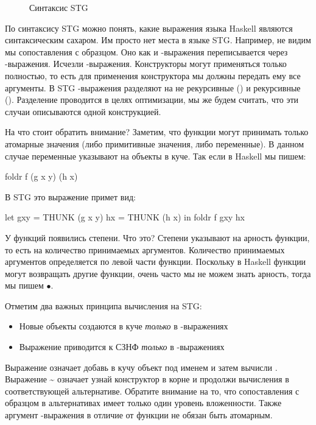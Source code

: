 \begin{figure}[ht]
\centering

\caption{Синтаксис STG}
\label{fig:stg1}
\end{figure}

По синтаксису STG можно понять, какие выражения языка Haskell являются
синтаксическим сахаром. Им просто нет места в языке STG. Например, не
видим мы сопоставления с образцом. Оно как и -выражения
переписывается через -выражения. Исчезли -выражения.
Конструкторы могут применяться только полностью, то есть для применения
конструктора мы должны передать ему все аргументы. В STG
-выражения разделяют на не рекурсивные () и рекурсивные
(). Разделение проводится в целях оптимизации, мы же будем
считать, что эти случаи описываются одной конструкцией.

На что стоит обратить внимание? Заметим, что функции могут принимать
только атомарные значения (либо примитивные значения, либо переменные).
В данном случае переменные указывают на объекты в куче. Так если в
Haskell мы пишем:


\begin{code}
foldr f (g x y) (h x)
\end{code}

В STG это выражение примет вид:


\begin{code}
let gxy = THUNK (g x y)
    hx  = THUNK (h x)
in  foldr f gxy hx
\end{code}

У функций появились степени. Что это? Степени указывают на арность
функции, то есть на количество принимаемых аргументов. Количество
принимаемых аргументов определяется по левой части функции. Поскольку в
Haskell функции могут возвращать другие функции, очень часто мы не можем
знать арность, тогда мы пишем $\bullet$.

Отметим два важных принципа вычисления на STG:

\begin{itemize}
\item
  Новые объекты создаются в куче \emph{только} в -выражениях
\item
  Выражение приводится к СЗНФ \emph{только} в -выражениях
\end{itemize}

Выражение  означает добавь в кучу объект 
под именем  и затем вычисли . Выражение
\textasciitilde{} означает узнай
конструктор в корне  и продолжи вычисления в соответствующей
альтернативе. Обратите внимание на то, что сопоставления с образцом в
альтернативах имеет только один уровень вложенности. Также аргумент
-выражения в отличие от функции не обязан быть атомарным.

